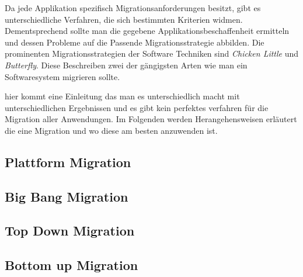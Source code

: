 Da jede Applikation spezifisch Migrationsanforderungen besitzt, gibt es unterschiedliche Verfahren, die sich bestimmten Kriterien widmen. Dementsprechend sollte man die gegebene Applikationsbeschaffenheit ermitteln und dessen Probleme auf die Passende Migrationsstrategie abbilden. Die prominenten Migrationsstrategien der Software Techniken sind \textit{Chicken Little} und \textit{Butterfly}. Diese Beschreiben zwei der gängigsten Arten wie man ein Softwaresystem migrieren sollte. 






hier kommt eine Einleitung das man es unterschiedlich macht mit  unterschiedlichen Ergebnissen und  es gibt kein perfektes verfahren für die Migration aller Anwendungen.
Im Folgenden werden Herangehensweisen  erläutert die eine Migration  und wo diese am besten anzuwenden ist. 


\subsection{Plattform Migration}

\subsection{Big Bang Migration}

\subsection{Top Down Migration}

\subsection{Bottom up Migration}


